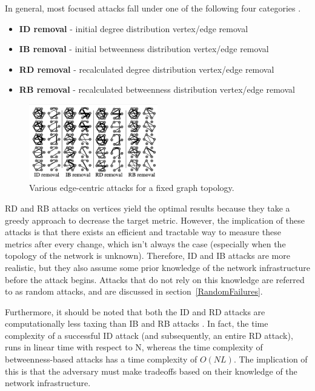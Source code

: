 \documentclass[doc]{apa}%
\begin{document}
In general, most focused attacks fall under one of the following four categories \cite{Attacks}.
\begin{itemize}
	\item \textbf{ID removal} - initial degree distribution vertex/edge removal
	\item \textbf{IB removal} - initial betweenness distribution vertex/edge removal
	\item \textbf{RD removal} - recalculated degree distribution vertex/edge removal
	\item \textbf{RB removal} - recalculated betweenness distribution vertex/edge removal
\end{itemize}

\begin{figure}[h!]
	\label{fig:Onion}
	\centering
		\includegraphics[width=0.5\textwidth]{edge_attacks.png}
	\caption{Various edge-centric attacks for a fixed graph topology.}
\end{figure}

RD and RB attacks on vertices yield the optimal results because they take a greedy approach to decrease the target metric. However, the implication of these attacks is that there exists an efficient and tractable way to measure these metrics after every change, which isn't always the case (especially when the topology of the network is unknown). Therefore, ID and IB attacks are more realistic, but they also assume some prior knowledge of the network infrastructure before the attack begins. Attacks that do not rely on this knowledge are referred to as random attacks, and are discussed in section~\ref{RandomFailures}.

Furthermore, it should be noted that both the ID and RD attacks are computationally less taxing than IB and RB attacks \cite{Attacks}. In fact, the time complexity of a successful ID attack (and subsequently, an entire RD attack), runs in linear time with respect to N, whereas the time complexity of betweenness-based attacks has a time complexity of $O(NL)$. The implication of this is that the adversary must make tradeoffs based on their knowledge of the network infrastructure.
\end{document}
